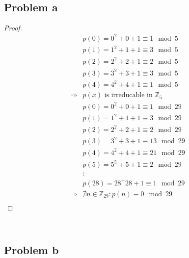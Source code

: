 \documentclass{article}
\begin{document}
~

\subsection*{Problem a}

\begin{proof}
    \begin{align*}
        &p(0)=0^2+0+1\equiv 1\mod 5\\
        &p(1)=1^2+1+1\equiv 3\mod 5\\
        &p(2)=2^2+2+1\equiv 2\mod 5\\
        &p(3)=3^2+3+1\equiv 3\mod 5\\
        &p(4)=4^2+4+1\equiv 1\mod 5\\
        \Rightarrow&p(x)\text{ is irreducable in }\mathbb{Z} _5\\
        &p(0)=0^2+0+1\equiv 1\mod 29\\
        &p(1)=1^2+1+1\equiv 3\mod 29\\
        &p(2)=2^2+2+1\equiv 2\mod 29\\
        &p(3)=3^2+3+1\equiv 13\mod 29\\
        &p(4)=4^2+4+1\equiv 21\mod 29\\
        &p(5)=5^5+5+1\equiv 2\mod 29\\
        &\vdots \\
        &p(28)=28^+28+1\equiv 1\mod 29\\
        \Rightarrow&\nexists n\in \mathbb{Z} _29:p(n)\equiv 0\mod 29\\
    \end{align*}
\end{proof}

~

\subsection*{Problem b}

~
\end{document}
